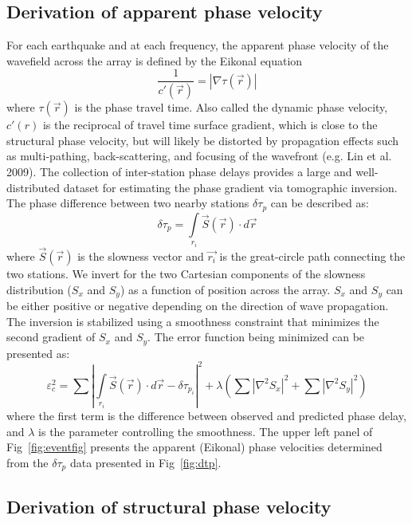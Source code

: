 \documentclass[referee]{gji}
\begin{document}
\subsection{Derivation of apparent phase velocity}
\label{sec:apv}

For each earthquake and at each frequency, the apparent phase velocity of the wavefield across the array is defined by the Eikonal equation 
\[
\frac{1}{c'(\vec{r})} = |\nabla \tau(\vec{r})|
\]
where $\tau(\vec{r})$ is the phase travel time. Also called the dynamic phase velocity, $c'(r)$ is the reciprocal of travel time surface gradient, which is close to the structural phase velocity, but will likely be distorted by propagation effects such as multi-pathing, back-scattering, and focusing of the wavefront (e.g. Lin et al. 2009).  The collection of inter-station phase delays provides a large and well-distributed dataset for estimating the phase gradient via tomographic inversion. The phase difference between two nearby stations $\delta \tau_p$ can be described as:
\[
\delta \tau_p = \int\limits_{r_i} \vec{S}(\vec{r}) \cdot d\vec{r}
\]
where $\vec{S}(\vec{r})$ is the slowness vector and $\vec{r_i}$ is the great-circle path connecting the two stations. We invert for the two Cartesian components of the slowness distribution ($S_x$ and $S_y$) as a function of position across the array. $S_x$ and $S_y$ can be either positive or negative depending on the direction of wave propagation.  The inversion is stabilized using a smoothness constraint that minimizes the second gradient of $S_x$ and $S_y$. The error function being minimized can be presented as:
\[
\varepsilon_{c}^2 = \sum \left| \int\limits_{r_i} \vec{S}(\vec{r}) \cdot d\vec{r} - \delta \tau_{p_i}\right|^2 + \lambda \left( \sum |\nabla^2 S_x|^2 + \sum |\nabla^2 S_y|^2 \right)
\]
where the first term is the difference between observed and predicted phase delay, and $\lambda$ is the parameter controlling the smoothness. The upper left panel of Fig~\ref{fig:eventfig} presents the apparent (Eikonal) phase velocities determined from the $\delta \tau_p$ data presented in Fig~\ref{fig:dtp}.    


\subsection{Derivation of structural phase velocity}
\label{sec:ampcor}
\end{document}
